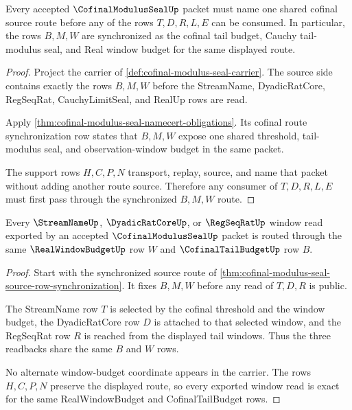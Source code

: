 \begin{theorem}
\label{thm:cofinal-modulus-seal-source-row-synchronization}
Every accepted $\CofinalModulusSealUp$ packet must name one shared cofinal source route before any of the rows $T,D,R,L,E$ can be consumed. In particular, the rows $B,M,W$ are synchronized as the cofinal tail budget, Cauchy tail-modulus seal, and Real window budget for the same displayed route.
\end{theorem}
\begin{proof}
Project the carrier of \autoref{def:cofinal-modulus-seal-carrier}. The source side contains exactly the rows $B,M,W$ before the StreamName, DyadicRatCore, RegSeqRat, CauchyLimitSeal, and RealUp rows are read.

Apply \autoref{thm:cofinal-modulus-seal-namecert-obligations}. Its cofinal route synchronization row states that $B,M,W$ expose one shared threshold, tail-modulus seal, and observation-window budget in the same packet.

The support rows $H,C,P,N$ transport, replay, source, and name that packet without adding another route source. Therefore any consumer of $T,D,R,L,E$ must first pass through the synchronized $B,M,W$ route.
\end{proof}

\begin{theorem}
\label{thm:cofinal-modulus-seal-window-budget-exactness}
Every $\StreamNameUp$, $\DyadicRatCoreUp$, or $\RegSeqRatUp$ window read exported by an accepted $\CofinalModulusSealUp$ packet is routed through the same $\RealWindowBudgetUp$ row $W$ and $\CofinalTailBudgetUp$ row $B$.
\end{theorem}
\begin{proof}
Start with the synchronized source route of \autoref{thm:cofinal-modulus-seal-source-row-synchronization}. It fixes $B,M,W$ before any read of $T,D,R$ is public.

The StreamName row $T$ is selected by the cofinal threshold and the window budget, the DyadicRatCore row $D$ is attached to that selected window, and the RegSeqRat row $R$ is reached from the displayed tail windows. Thus the three readbacks share the same $B$ and $W$ rows.

No alternate window-budget coordinate appears in the carrier. The rows $H,C,P,N$ preserve the displayed route, so every exported window read is exact for the same RealWindowBudget and CofinalTailBudget rows.
\end{proof}


